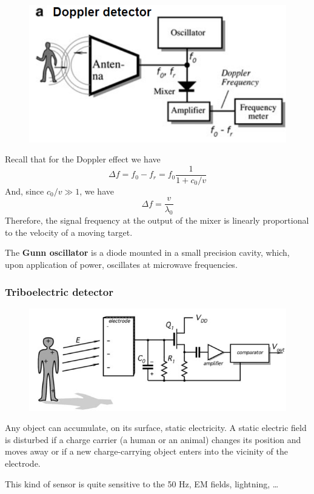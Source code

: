 \begin{minipage}{0.45 \linewidth}
\begin{figure}[H]
    \centering
    \includegraphics[width = 0.8 \textwidth]{L7/img/doppler-detector.PNG}
\end{figure}
\end{minipage}\hfill
\begin{minipage}{0.45 \linewidth}
Recall that for the Doppler effect we have $$\Delta f = f_0 - f_r = f_0 \frac{1}{1+c_0/v}$$
And, since $c_0/v\gg 1$, we have $$ \Delta f = \frac{v}{\lambda_0} $$ 
Therefore, the signal frequency at the output of the mixer is linearly proportional
to the velocity of a moving target. 

The \textbf{Gunn oscillator} is a diode mounted in a small precision cavity,
which, upon application of power, oscillates at microwave frequencies.
\end{minipage}

\subsubsection{Triboelectric detector}

\begin{minipage}{0.5 \linewidth}
\begin{figure}[H]
    \centering
    \includegraphics[width = 0.6 \textwidth]{L7/img/triboelectric.PNG}
\end{figure}
\end{minipage}\hfill
\begin{minipage}{0.5 \linewidth}
Any object can accumulate, on its surface, static electricity.
A static electric field is disturbed if a charge carrier (a human or an animal) changes its position and moves away
or if a new charge-carrying object enters into the vicinity of the electrode.

This kind of sensor is quite sensitive to the 50 Hz, EM fields, lightning, \dots
\end{minipage}


